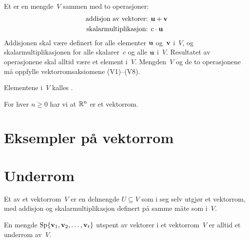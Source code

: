 \begin{defn} %
Et  er en mengde~$V$ sammen med to operasjoner:
\begin{align*}
\text{addisjon av vektorer: } & \mathbf{u} + \mathbf{v} \\
\text{skalarmultiplikasjon: } & c \cdot \mathbf{u}
\end{align*}
Addisjonen skal være definert for alle elementer $\mathbf{u}$ og~$\mathbf{v}$
i~$V$, og skalarmultiplikasjonen for alle skalarer~$c$ og alle $\mathbf{u}$
i~$V$.  Resultatet av operasjonene skal alltid være et element i~$V$.
Mengden~$V$ og de to operasjonene må oppfylle vektorromsaksiomene
(V1)--(V8).

Elementene i~$V$ kalles .
\end{defn}


\begin{ex}
For hver $n \ge 0$ har vi at $\mathbb{R}^n$ er et vektorrom.
\end{ex}


\section*{Eksempler på vektorrom}



\section*{Underrom}

\begin{defn}
Et  av et vektorrom~$V$ er en delmengde
$U \subseteq V$ som i seg selv utgjør et vektorrom, med addisjon og
skalarmultiplikasjon definert på samme måte som i~$V$.
\end{defn}



\begin{thm}
\label{thm:underrom}
\end{thm}

\begin{thm}
\label{thm:underrom-sp}
En mengde $\operatorname{Sp} \{ \mathbf{v}_1, \mathbf{v}_2, \ldots, \mathbf{v}_t \}$ utspent av vektorer
i et vektorrom~$V$ er alltid et underrom av~$V$.
\end{thm}


